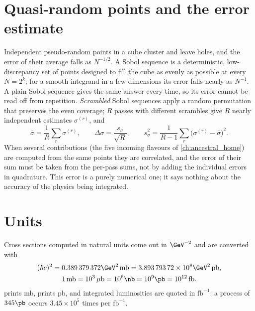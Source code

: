 \section{Quasi-random points and the error estimate}
\label{app:kinematics:sobol}

Independent pseudo-random points in a cube cluster and leave holes, and the
error of their average falls as $N^{-1/2}$. A Sobol sequence is a
deterministic, low-discrepancy set of points designed to fill the cube as
evenly as possible at every $N=2^k$; for a smooth integrand in a few
dimensions its error falls nearly as $N^{-1}$. A plain Sobol sequence gives
the same answer every time, so its error cannot be read off from repetition.
\emph{Scrambled} Sobol sequences apply a random permutation that preserves
the even coverage; $R$ passes with different scrambles give $R$ nearly
independent estimates $\sigma^{(r)}$, and
\begin{equation}
  \bar\sigma=\frac1R\sum_r\sigma^{(r)},\qquad
  \Delta\sigma=\frac{s_\sigma}{\sqrt R},\qquad
  s_\sigma^2=\frac1{R-1}\sum_r\bigl(\sigma^{(r)}-\bar\sigma\bigr)^2 .
  \label{eq:app:error}
\end{equation}
When several contributions (the five incoming flavours of
\cref{ch:ancestral_home}) are computed from the same points they are
correlated, and the error of their sum must be taken from the per-pass sums,
not by adding the individual errors in quadrature. This error is a purely
numerical one; it says nothing about the accuracy of the physics being
integrated.

\section{Units}
\label{app:kinematics:units}

Cross sections computed in natural units come out in $\GeV^{-2}$ and are
converted with
\begin{gather}
  (\hbar c)^2=0.389\,379\,372\GeV^2\,\mathrm{mb}
  =3.893\,793\,72\times10^{8}\GeV^2\,\mathrm{pb},\\
  1\,\mathrm{mb}=10^{3}\,\mu\mathrm b=10^{6}\nb=10^{9}\pb=10^{12}\,\mathrm{fb}.
\end{gather}
\PYTHIA prints mb, \MG prints pb, and integrated luminosities are quoted in
$\mathrm{fb}^{-1}$: a process of $345\pb$ occurs $3.45\times10^{5}$ times per
$\mathrm{fb}^{-1}$.
